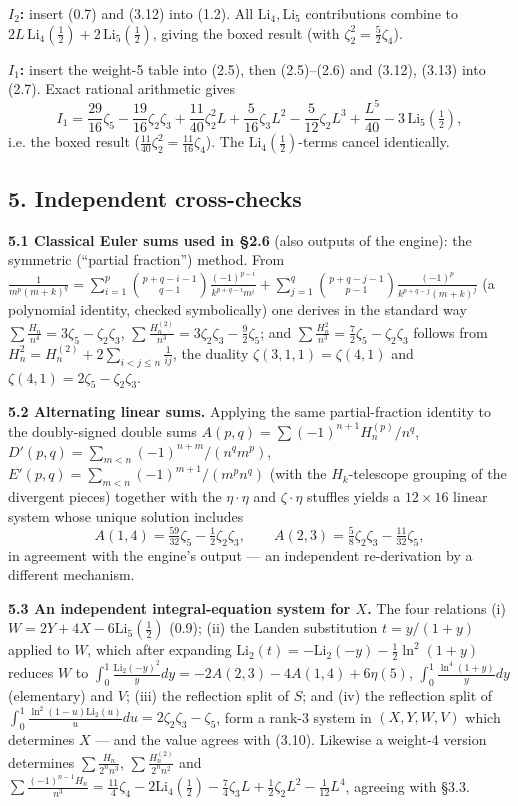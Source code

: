 \documentclass[11pt]{article}
\theoremstyle{remark}
\begin{document}
\textbf{$I_2$:} insert (0.7) and (3.12) into (1.2). All $\mathrm{Li}_4,\mathrm{Li}_5$ contributions combine to $2L\,\mathrm{Li}_4(\tfrac12)+2\,\mathrm{Li}_5(\tfrac12)$, giving the boxed result (with $\zeta_2^2=\tfrac52\zeta_4$).

\textbf{$I_1$:} insert the weight-5 table into (2.5), then (2.5)--(2.6) and (3.12), (3.13) into (2.7). Exact rational arithmetic gives
\[
I_1=\frac{29}{16}\zeta_5-\frac{19}{16}\zeta_2\zeta_3+\frac{11}{40}\zeta_2^2L+\frac5{16}\zeta_3L^2-\frac5{12}\zeta_2L^3+\frac{L^5}{40}-3\,\mathrm{Li}_5(\tfrac12),
\]
i.e. the boxed result ($\tfrac{11}{40}\zeta_2^2=\tfrac{11}{16}\zeta_4$). The $\mathrm{Li}_4(\tfrac12)$-terms cancel identically.

\subsection*{5. Independent cross-checks}

\textbf{5.1 Classical Euler sums used in \S2.6} (also outputs of the engine): the symmetric (``partial fraction'') method. From
$\frac1{m^p(m+k)^q}=\sum_{i=1}^{p}\binom{p+q-i-1}{q-1}\frac{(-1)^{p-i}}{k^{p+q-i}m^i}+\sum_{j=1}^{q}\binom{p+q-j-1}{p-1}\frac{(-1)^p}{k^{p+q-j}(m+k)^j}$
(a polynomial identity, checked symbolically) one derives in the standard way
$\sum\frac{H_n}{n^4}=3\zeta_5-\zeta_2\zeta_3$, $\sum\frac{H^{(2)}_n}{n^3}=3\zeta_2\zeta_3-\frac92\zeta_5$; and
$\sum\frac{H_n^2}{n^3}=\frac72\zeta_5-\zeta_2\zeta_3$ follows from $H_n^2=H_n^{(2)}+2\sum_{i<j\le n}\frac1{ij}$, the duality $\zeta(3,1,1)=\zeta(4,1)$ and $\zeta(4,1)=2\zeta_5-\zeta_2\zeta_3$.

\textbf{5.2 Alternating linear sums.} Applying the same partial-fraction identity to the doubly-signed double sums
$A(p,q)=\sum(-1)^{n+1}H^{(p)}_n/n^q$, $D'(p,q)=\sum_{m<n}(-1)^{n+m}/(n^qm^p)$, $E'(p,q)=\sum_{m<n}(-1)^{m+1}/(m^pn^q)$ (with the $H_k$-telescope grouping of the divergent pieces) together with the $\eta\cdot\eta$ and $\zeta\cdot\eta$ stuffles yields a $12\times16$ linear system whose unique solution includes
\[
A(1,4)=\tfrac{59}{32}\zeta_5-\tfrac12\zeta_2\zeta_3,\qquad A(2,3)=\tfrac58\zeta_2\zeta_3-\tfrac{11}{32}\zeta_5,
\]
in agreement with the engine's output --- an independent re-derivation by a different mechanism.

\textbf{5.3 An independent integral-equation system for $X$.} The four relations
(i) $W=2Y+4X-6\mathrm{Li}_5(\tfrac12)$ (0.9);
(ii) the Landen substitution $t=y/(1+y)$ applied to $W$, which after expanding
$\mathrm{Li}_2(t)=-\mathrm{Li}_2(-y)-\tfrac12\ln^2(1+y)$ reduces $W$ to $\int_0^1\frac{\mathrm{Li}_2(-y)^2}{y}dy=-2A(2,3)-4A(1,4)+6\eta(5)$, $\int_0^1\frac{\ln^4(1+y)}ydy$ (elementary) and $V$;
(iii) the reflection split of $S$; and
(iv) the reflection split of $\int_0^1\frac{\ln^2(1-u)\mathrm{Li}_2(u)}{u}du=2\zeta_2\zeta_3-\zeta_5$,
form a rank-3 system in $(X,Y,W,V)$ which determines $X$ --- and the value agrees with (3.10). Likewise a weight-4 version determines $\sum\frac{H_n}{2^nn^3}$, $\sum\frac{H^{(2)}_n}{2^nn^2}$ and $\sum\frac{(-1)^{n-1}H_n}{n^3}=\tfrac{11}4\zeta_4-2\mathrm{Li}_4(\tfrac12)-\tfrac74\zeta_3L+\tfrac12\zeta_2L^2-\tfrac1{12}L^4$, agreeing with \S3.3.
\end{document}
